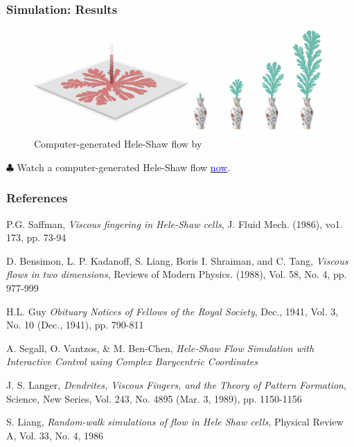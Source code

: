 \documentclass{beamer}
\begin{document}
\begin{frame}
\frametitle{Simulation: Results}
    \begin{figure}
        \centering
        \includegraphics[scale=0.31]{sim_3}
        \caption{Computer-generated Hele-Shaw flow by \cite{Simulate}}
        \label{fig:Simulated_HS}
    \end{figure}
    
$\clubsuit$ Watch a computer-generated Hele-Shaw flow \underline{\textcolor{blue}{now}}.
\end{frame}






\begin{frame}
\frametitle{References}
\begin{thebibliography}{99}

 P.G. Saffman,  \textit{Viscous fingering in Hele-Shaw cells}, J. Fluid Mech. (1986), vo1. 173, pp. 73-94

 D. Bensimon, L. P. Kadanoff, S. Liang, Boris I. Shraiman, and C. Tang, \textit{Viscous flows in two dimensions}, Reviews of Modern Physics. (1988), Vol. 58, No. 4, pp. 977-999

 H.L. Guy \textit{ Obituary Notices of Fellows of the Royal Society}, Dec., 1941, Vol. 3, No. 10 (Dec., 1941), pp. 790-811

 A. Segall, O. Vantzos, \& M. Ben-Chen,  \textit{Hele-Shaw Flow Simulation with Interactive Control using Complex Barycentric Coordinates}

 J. S. Langer, \textit{Dendrites, Viscous Fingers, and the Theory of Pattern Formation}, Science, New Series, Vol. 243, No. 4895 (Mar. 3, 1989), pp. 1150-1156

 S. Liang, \textit{Random-walk simulations of flow in Hele Shaw cells}, Physical Review A, Vol. 33, No. 4, 1986


\end{thebibliography}


\end{frame}

\end{document}
